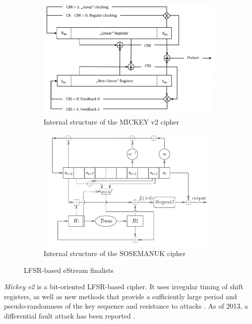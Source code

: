 \begin{figure}[h]
	\vspace{0.2cm}
	\begin{subfigure}{0.5\textwidth}
		\includegraphics[width=1\textwidth,height=170pt]{img/mickeyv2.png} 
		\vspace{5pt}
		\caption{Internal structure of the MICKEY v2 cipher \cite{babbage2006stream}}
		\label{fig:mickeyv2}
	\end{subfigure}
	\begin{subfigure}{0.5\textwidth}
		\includegraphics[width=1\textwidth,height=170pt]{img/SOSEMANUK.png} 
		\vspace{5pt}
		\caption{Internal structure of the SOSEMANUK cipher \cite{SOSEMANUKImage}}
		\label{fig:sosemanuk}
	\end{subfigure}
	
	\caption{LFSR-based eStream finalists}
	\label{fig:lfsr}
	\vspace{0.3cm}
\end{figure}


\emph{Mickey v2} is a bit-oriented LFSR-based cipher. It uses irregular timing of shift registers, as well as new methods that provide a sufficiently large period and pseudo-randomness of the key sequence and resistance to attacks \cite{babbage2006stream}. As of 2013, a differential fault attack has been reported \cite{banik2015improved}.\\

